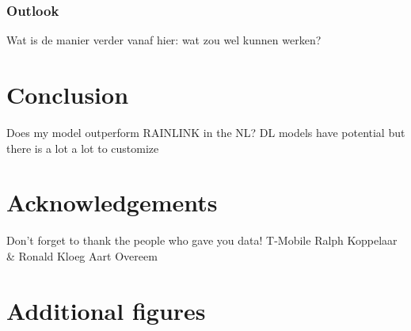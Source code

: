 \documentclass[twocolumn, 10pt, a4paper]{memoir}
\begin{document}
	\subsection{Outlook}
	Wat is de manier verder vanaf hier: wat zou wel kunnen werken? 
	
	
	\chapter{Conclusion} \label{ch: conclusion}
	Does my model outperform RAINLINK in the NL?
	DL models have potential but there is a lot a lot to customize
	
	
	
	\chapter*{Acknowledgements}\vspace{-6mm}       %
	
	Don't forget to thank the people who gave you data!
	T-Mobile Ralph Koppelaar \& Ronald Kloeg 
	Aart Overeem
	
	\renewcommand{\bibname}{Bibliography}
	
	
	
	
	
	
	\appendix
	\chapter{Additional figures}
	
	
	
	
\end{document}
